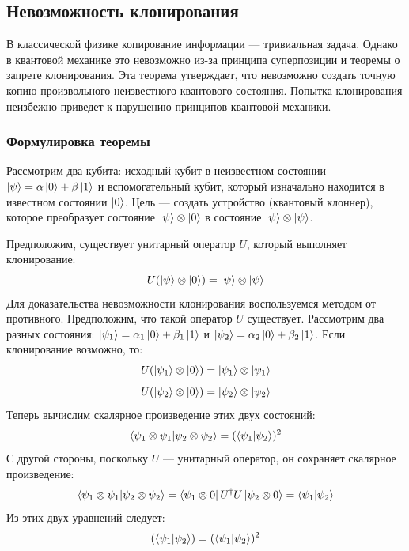 \documentclass[12pt,a4paper]{article}
\begin{document}
	   \subsection{Невозможность клонирования} 
		В классической физике копирование информации — тривиальная задача. Однако в квантовой механике это невозможно из-за принципа суперпозиции и теоремы о запрете клонирования. Эта теорема утверждает, что невозможно создать точную копию произвольного неизвестного квантового состояния. Попытка клонирования неизбежно приведет к нарушению принципов квантовой механики.
		
		\subsubsection{Формулировка теоремы}
		
		Рассмотрим два кубита: исходный кубит в неизвестном состоянии $\ket{\psi} = \alpha\ket{0} + \beta\ket{1}$ и вспомогательный кубит, который изначально находится в известном состоянии $\ket{0}$. Цель — создать устройство (квантовый клоннер), которое преобразует состояние $\ket{\psi} \otimes \ket{0}$ в состояние $\ket{\psi} \otimes \ket{\psi}$.
		
		Предположим, существует унитарный оператор $U$, который выполняет клонирование:
		\begin{equation}
		U (\ket{\psi} \otimes \ket{0}) = \ket{\psi} \otimes \ket{\psi}
		\end{equation}
		Для доказательства невозможности клонирования воспользуемся методом от противного. Предположим, что такой оператор $U$ существует. Рассмотрим два разных состояния: $\ket{\psi_1} = \alpha_1\ket{0} + \beta_1\ket{1}$ и $\ket{\psi_2} = \alpha_2\ket{0} + \beta_2\ket{1}$. Если клонирование возможно, то:
			\begin{equation}
		U (\ket{\psi_1}  \otimes \ket{0}) = \ket{\psi_1}  \otimes  \ket{\psi_1}
	\end{equation}
			\begin{equation}
		U (\ket{\psi_2}  \otimes \ket{0}) = \ket{\psi_2} \otimes  \ket{\psi_2}
	\end{equation}
		Теперь вычислим скалярное произведение этих двух состояний:
			\begin{equation}
		\braket{\psi_1 \otimes \psi_1}{\psi_2 \otimes \psi_2}=(\braket{\psi_1}{\psi_2})^{2}
			\end{equation}
		С другой стороны, поскольку $U$ — унитарный оператор, он сохраняет скалярное произведение:
			\begin{equation}
					\braket{\psi_1 \otimes \psi_1}{\psi_2 \otimes \psi_2}=	\bra{\psi_1 \otimes 0}U^\dag U \ket{\psi_2 \otimes 0}=\braket{\psi_1}{\psi_2}
				\end{equation}
		Из этих двух уравнений следует:
		\begin{equation}
	(\braket{\psi_1}{\psi_2})=(\braket{\psi_1}{\psi_2})^{2}
			\end{equation}
		
\end{document}
